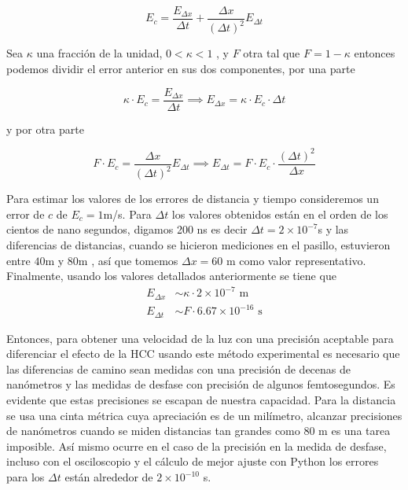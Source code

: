 \begin{equation}
    E_c = \frac{E_{\Delta x}}{\Delta t} + \frac{\Delta x}{(\Delta t)^2} E_{\Delta t} 
\end{equation}

Sea $\kappa$ una fracción de la unidad, $0 < \kappa < 1$ , y $F$ otra tal que $F = 1 - \kappa$ entonces podemos dividir el error anterior en sus dos componentes, por una parte

\begin{equation}
    \kappa \cdot E_c = \frac{E_{\Delta x}}{\Delta t} \implies E_{\Delta x} = \kappa \cdot E_c \cdot \Delta t
\end{equation}

y por otra parte

\begin{equation}
    F \cdot E_c = \frac{\Delta x}{(\Delta t)^2} E_{\Delta t} \implies E_{\Delta t} = F \cdot E_c \cdot \frac{(\Delta t)^2}{\Delta x}
\end{equation}

Para estimar los valores de los errores de distancia y tiempo consideremos un error de $c$ de  $E_c = 1$m/s. Para  $\Delta t$ los valores obtenidos están en el orden de los cientos de nano segundos, digamos 200 ns  es decir    $\Delta t= 2 \times 10^{-7}$s y las diferencias de distancias, cuando se hicieron mediciones en el pasillo, estuvieron entre $40$m y $80$m , así que tomemos   $\Delta x= 60$ m como valor representativo. Finalmente, usando los valores detallados anteriormente se tiene que
\begin{align}
    E_{\Delta x} &\sim \kappa \cdot 2 \times 10^{-7} \text{ m} \\
    E_{\Delta t} &\sim F \cdot 6.67 \times 10^{-16} \text{ s}
\end{align}

Entonces, para obtener una velocidad de la luz con una precisión aceptable para diferenciar el efecto de la \ac{HCC} usando este método experimental es necesario que las diferencias de camino sean medidas con una precisión de decenas de nanómetros y las medidas de desfase con precisión de algunos femtosegundos. Es evidente que estas precisiones se escapan de nuestra capacidad. Para la distancia se usa una cinta métrica cuya apreciación es de un milímetro, alcanzar precisiones de nanómetros cuando se miden distancias tan grandes como $80$ m es una tarea imposible. Así mismo ocurre en el caso de la precisión en la medida de desfase, incluso con el osciloscopio y el cálculo de mejor ajuste con Python los errores para los $\Delta t$   están alrededor de $2 \times 10 ^{-10}$ s.


